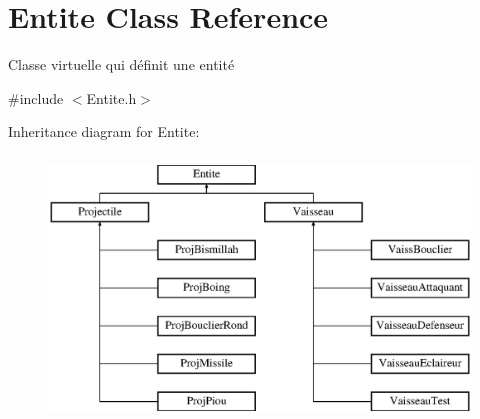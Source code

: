 \hypertarget{class_entite}{}\section{Entite Class Reference}
\label{class_entite}


Classe virtuelle qui définit une entité  




{\ttfamily \#include $<$Entite.\+h$>$}

Inheritance diagram for Entite\+:\begin{figure}[H]
\begin{center}
\leavevmode
\includegraphics[height=7.000000cm]{class_entite}
\end{center}
\end{figure}
